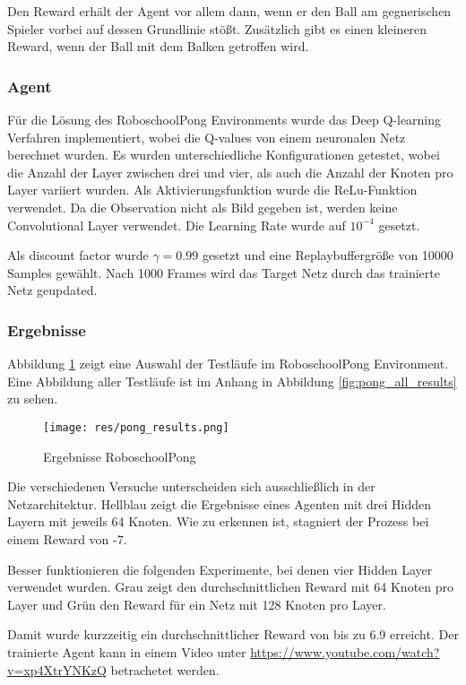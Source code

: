 \documentclass[11pt]{scrartcl}
\begin{document}
Den Reward erhält der Agent vor allem dann, wenn er den Ball am gegnerischen Spieler vorbei
auf dessen Grundlinie stößt. Zusätzlich gibt es einen kleineren Reward, wenn der Ball mit
dem Balken getroffen wird.

\subsubsection{Agent}
Für die Lösung des RoboschoolPong Environments wurde das Deep Q-learning Verfahren implementiert,
wobei die Q-values von einem neuronalen Netz berechnet wurden. Es wurden unterschiedliche
Konfigurationen getestet, wobei die Anzahl der Layer zwischen drei und vier, als auch die
Anzahl der Knoten pro Layer variiert wurden. Als Aktivierungsfunktion wurde die
ReLu-Funktion verwendet. Da die Observation nicht als Bild gegeben ist, werden keine
Convolutional Layer verwendet. Die Learning Rate wurde auf $10^{-4}$ gesetzt.

Als discount factor wurde $\gamma = 0.99$ gesetzt und eine Replaybuffergröße von 10000
Samples gewählt. Nach 1000 Frames wird das Target Netz durch das trainierte Netz geupdated.

\subsubsection{Ergebnisse}
Abbildung \ref{fig:pong_results} zeigt eine Auswahl der Testläufe im RoboschoolPong Environment.
Eine Abbildung aller Testläufe ist im Anhang in Abbildung \ref{fig:pong_all_results} zu
sehen.

\begin{figure}[htp]
\centering
\texttt{[image: res/pong\_results.png]}
\caption{Ergebnisse RoboschoolPong}
\label{fig:pong_results}
\end{figure}
\noindent
Die verschiedenen Versuche unterscheiden sich ausschließlich in der Netzarchitektur. Hellblau zeigt
die Ergebnisse eines Agenten mit drei Hidden Layern mit jeweils 64 Knoten. Wie zu erkennen ist,
stagniert der Prozess bei einem Reward von -7.

Besser funktionieren die folgenden Experimente, bei denen vier Hidden Layer verwendet wurden.
Grau zeigt den durchschnittlichen Reward mit 64 Knoten pro Layer und Grün den Reward für
ein Netz mit 128 Knoten pro Layer.

Damit wurde kurzzeitig ein durchschnittlicher Reward von bis zu 6.9 erreicht. Der
trainierte Agent kann in einem Video unter \url{https://www.youtube.com/watch?v=xp4XtrYNKzQ}
betrachetet werden.
\end{document}
